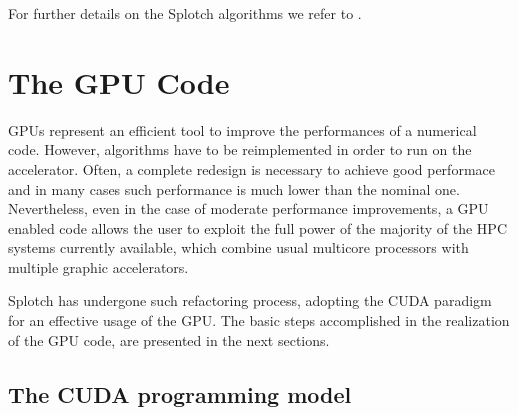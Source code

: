 \documentclass[11pt]{article}
\begin{document}
For further details on the Splotch algorithms we refer to \cite{2008NJPh...10l5006D}.

\section{The GPU Code}
\label{sec:gpu-code}

GPUs represent an efficient tool to improve the performances of a numerical code.
However, algorithms have to be reimplemented in order to run on the accelerator. 
Often, a complete redesign is necessary to achieve good performace and in many
cases such performance is much lower than the nominal one. Nevertheless, even in 
the case of moderate performance improvements, a GPU enabled code allows the 
user to exploit the full power of the majority of the HPC systems currently 
available, which combine usual multicore processors with multiple graphic accelerators.

Splotch has undergone such refactoring process, adopting the CUDA paradigm 
for an effective usage of the GPU. The basic steps accomplished in
the realization of the GPU code, are presented in the next sections. 


\subsection{The CUDA programming model} 
\label{sec:cuda}
\end{document}
